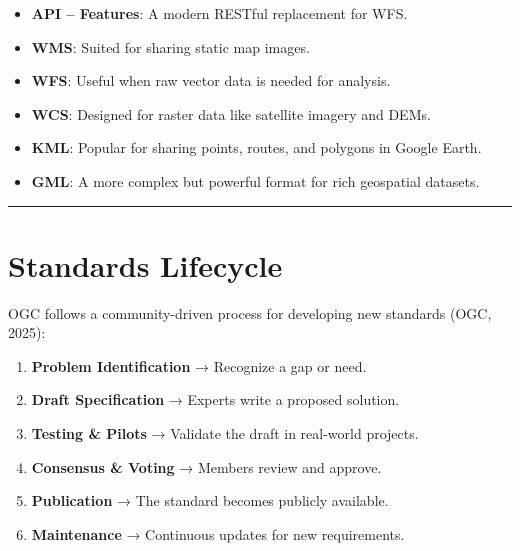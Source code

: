 \documentclass[
  11pt,
  letterpaper,
]{book}
\providecommand{\tightlist}{%
  \setlength{\itemsep}{0pt}\setlength{\parskip}{0pt}}
\begin{document}
\begin{itemize}
\tightlist
\item
  \textbf{API -- Features}: A modern RESTful replacement for WFS.\\
\item
  \textbf{WMS}: Suited for sharing static map images.\\
\item
  \textbf{WFS}: Useful when raw vector data is needed for analysis.\\
\item
  \textbf{WCS}: Designed for raster data like satellite imagery and
  DEMs.\\
\item
  \textbf{KML}: Popular for sharing points, routes, and polygons in
  Google Earth.\\
\item
  \textbf{GML}: A more complex but powerful format for rich geospatial
  datasets.
\end{itemize}

\begin{center}\rule{0.5\linewidth}{0.5pt}\end{center}

\section{Standards Lifecycle}\label{standards-lifecycle}

OGC follows a community-driven process for developing new standards
(OGC, 2025):

\begin{enumerate}
\def\labelenumi{\arabic{enumi}.}
\tightlist
\item
  \textbf{Problem Identification} → Recognize a gap or need.\\
\item
  \textbf{Draft Specification} → Experts write a proposed solution.\\
\item
  \textbf{Testing \& Pilots} → Validate the draft in real-world
  projects.\\
\item
  \textbf{Consensus \& Voting} → Members review and approve.\\
\item
  \textbf{Publication} → The standard becomes publicly available.\\
\item
  \textbf{Maintenance} → Continuous updates for new requirements.
\end{enumerate}
\end{document}
